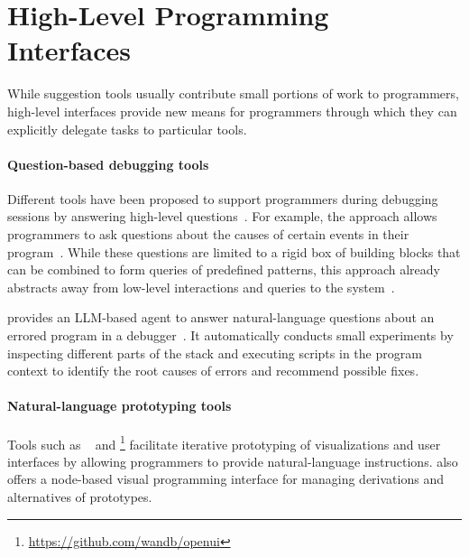 
\section{High-Level Programming Interfaces}
\label{sec:related_work/interfaces}

While suggestion tools usually contribute small portions of work to programmers, high-level interfaces provide new means for programmers through which they can explicitly delegate tasks to particular tools.

\paragraph{Question-based debugging tools}
\label{par:related_work/interfaces/debugging}

Different tools have been proposed to support programmers during debugging sessions by answering high-level questions~\cite{myers2004natural,deRoover2011soul}.
For example, the  approach allows programmers to ask questions about the causes of certain events in their program~\cite{ko2004designing}.
While these questions are limited to a rigid box of building blocks that can be combined to form queries of predefined patterns, this approach already abstracts away from low-level interactions and queries to the system~\cite{perscheid2014follow}.

 provides an LLM-based agent to answer natural-language questions about an errored program in a debugger~\cite{levin2024chatdbg}.
It automatically conducts small experiments by inspecting different parts of the stack and executing scripts in the program context to identify the root causes of errors and recommend possible fixes.

\paragraph{Natural-language prototyping tools}
\label{par:related_work/interfaces/prototyping}

Tools such as ~\cite{angert2023spellburst} and \footnote{\url{https://github.com/wandb/openui}} facilitate iterative prototyping of visualizations and user interfaces by allowing programmers to provide natural-language instructions.
 also offers a node-based visual programming interface for managing derivations and alternatives of prototypes.

